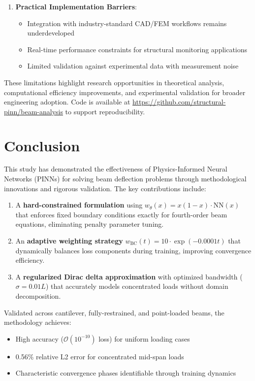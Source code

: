 \documentclass[12pt]{article}
\begin{document}
\begin{enumerate}
	\item \textbf{Practical Implementation Barriers}: 
	\begin{itemize}
		\item Integration with industry-standard CAD/FEM workflows remains underdeveloped
		\item Real-time performance constraints for structural monitoring applications
		\item Limited validation against experimental data with measurement noise
	\end{itemize}
\end{enumerate}

These limitations highlight research opportunities in theoretical analysis, computational efficiency improvements, and experimental validation for broader engineering adoption. Code is available at \url{https://github.com/structural-pinn/beam-analysis} to support reproducibility.

\section{Conclusion}
This study has demonstrated the effectiveness of Physics-Informed Neural Networks (PINNs) for solving beam deflection problems through methodological innovations and rigorous validation. The key contributions include:

\begin{enumerate}
	\item A \textbf{hard-constrained formulation} using $w_{\theta}(x) = x(1-x)\cdot\text{NN}(x)$ that enforces fixed boundary conditions exactly for fourth-order beam equations, eliminating penalty parameter tuning.
	\item An \textbf{adaptive weighting strategy} $w_{\text{BC}}(t)=10\cdot\exp(-0.0001t)$ that dynamically balances loss components during training, improving convergence efficiency.
	\item A \textbf{regularized Dirac delta approximation} with optimized bandwidth ($\sigma = 0.01L$) that accurately models concentrated loads without domain decomposition.
\end{enumerate}

Validated across cantilever, fully-restrained, and point-loaded beams, the methodology achieves:
\begin{itemize}
	\item High accuracy ($\mathcal{O}(10^{-10})$ loss) for uniform loading cases
	\item 0.56\% relative L2 error for concentrated mid-span loads
	\item Characteristic convergence phases identifiable through training dynamics
\end{itemize}
\end{document}
